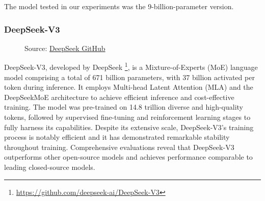 The model tested in our experiments was the 9-billion-parameter version.

\vspace{9mm}
\subsubsection{DeepSeek-V3}
\begin{figure}
  \centering
  \def\stackalignment{l}
  {\scriptsize \parbox[t]{\linewidth}{Source: \href{https://github.com/deepseek-ai}{DeepSeek GitHub}}}
\end{figure}
DeepSeek-V3, developed by DeepSeek \footnote{\url{https://github.com/deepseek-ai/DeepSeek-V3}},
is a Mixture-of-Experts (MoE) language model comprising a total of 671 billion
parameters, with 37 billion activated per token during inference. It employs
Multi-head Latent Attention (MLA) and the DeepSeekMoE architecture to achieve
efficient inference and cost-effective training. The model was pre-trained on 14.8
trillion diverse and high-quality tokens, followed by supervised fine-tuning and
reinforcement learning stages to fully harness its capabilities. Despite its extensive
scale, DeepSeek-V3's training process is notably efficient and it has
demonstrated remarkable stability throughout training. Comprehensive evaluations
reveal that DeepSeek-V3 outperforms other open-source models and achieves performance
comparable to leading closed-source models.

